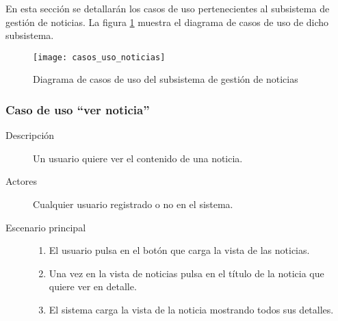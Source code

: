 En esta sección se detallarán los casos de uso pertenecientes al subsistema de gestión de noticias. La figura \ref{fig:casos_uso_subsistema_noticias} muestra el diagrama de casos de uso de dicho subsistema.

\begin{figure}[h]
\centering
\texttt{[image: casos\_uso\_noticias]}
\caption{Diagrama de casos de uso del subsistema de gestión de noticias}
\label{fig:casos_uso_subsistema_noticias}
\end{figure}


\subsubsection{Caso de uso ``ver noticia''}
\begin{description}
\item[Descripción] Un usuario quiere ver el contenido de una noticia.
\item[Actores] Cualquier usuario registrado o no en el sistema.
\item[Escenario principal] 	\hfill
							\begin{enumerate}
							\item El usuario pulsa en el botón que carga la vista de las noticias.
							\item Una vez en la vista de noticias pulsa en el título de la noticia que quiere ver en detalle.
							\item El sistema carga la vista de la noticia mostrando todos sus detalles.
							\end{enumerate}
\end{description}



